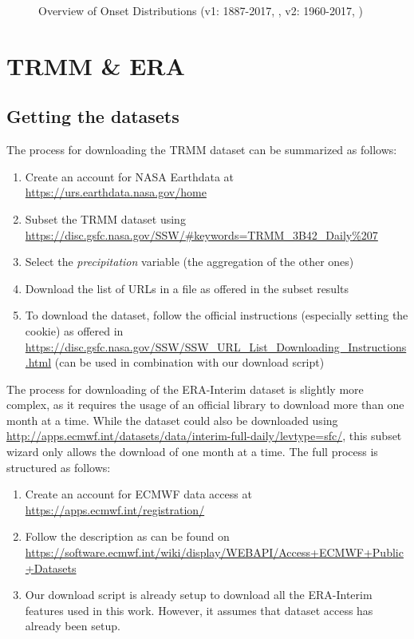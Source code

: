 \begin{figure}[h]
\begin{tabular}{cc}
  \end{tabular}
  \caption{Overview of Onset Distributions (v1: 1887-2017, \citet{Ordonez.2016, IndiaMeteorologicalDepartment.2017b}, v2: 1960-2017, \citet{Singh.2009, IndiaMeteorologicalDepartment.2017b})}
  \label{apx:onset_distributions_uncut}
\end{figure}

\clearpage
\section{TRMM \& ERA}
\label{apx:trmm_era}

\subsection{Getting the datasets}
\label{apx:download}
The process for downloading the TRMM dataset can be summarized as follows:
\begin{enumerate}
  \item Create an account for NASA Earthdata at \url{https://urs.earthdata.nasa.gov/home}
  \item Subset the TRMM dataset using \url{https://disc.gsfc.nasa.gov/SSW/#keywords=TRMM_3B42_Daily%207}
  \item Select the \textit{precipitation} variable (the aggregation of the other ones)
  \item Download the list of URLs in a file as offered in the subset results
  \item To download the dataset, follow the official instructions (especially setting the cookie) as offered in \url{https://disc.gsfc.nasa.gov/SSW/SSW_URL_List_Downloading_Instructions.html} (can be used in combination with our download script)
\end{enumerate}

The process for downloading of the ERA-Interim dataset is slightly more complex, as it requires the usage of an official library to download more than one month at a time. While the dataset could also be downloaded using \url{http://apps.ecmwf.int/datasets/data/interim-full-daily/levtype=sfc/}, this subset wizard only allows the download of one month at a time. The full process is structured as follows:
\begin{enumerate}
  \item Create an account for ECMWF data access at \url{https://apps.ecmwf.int/registration/}
  \item Follow the description as can be found on \url{https://software.ecmwf.int/wiki/display/WEBAPI/Access+ECMWF+Public+Datasets}
  \item Our download script is already setup to download all the ERA-Interim features used in this work. However, it assumes that dataset access has already been setup.
\end{enumerate}

